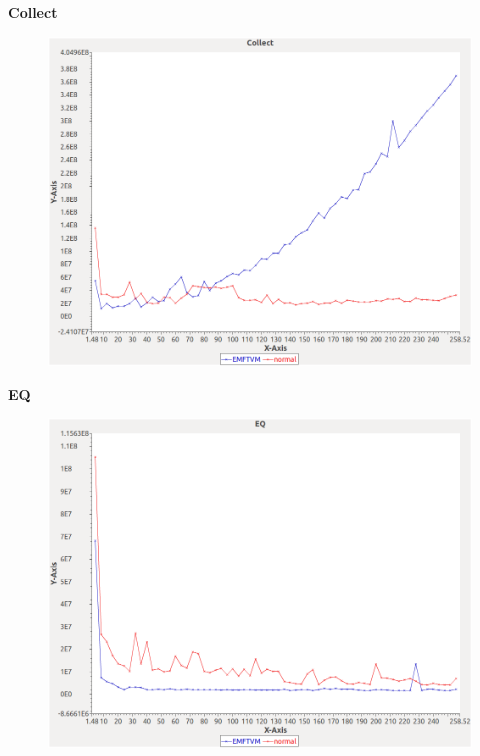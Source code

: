 \noindent\textbf{Collect}

\begin{figure}[h]
\centering
\includegraphics[width=\textwidth]{graphs/orderedset/Collect}
\end{figure}
\pagebreak

\noindent\textbf{EQ}

\begin{figure}[h]
\centering
\includegraphics[width=\textwidth]{graphs/orderedset/EQ}
\end{figure}
\pagebreak

